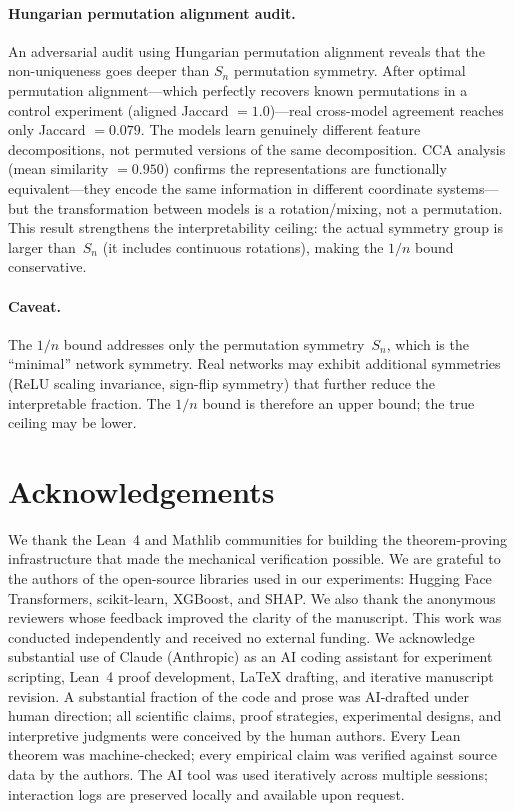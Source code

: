 \documentclass[11pt,a4paper]{article}
\begin{document}
\paragraph{Hungarian permutation alignment audit.}
An adversarial audit using Hungarian permutation alignment reveals that the
non-uniqueness goes deeper than $S_n$ permutation symmetry.  After optimal
permutation alignment---which perfectly recovers known permutations in a
control experiment (aligned Jaccard $= 1.0$)---real cross-model agreement
reaches only Jaccard $= 0.079$.  The models learn genuinely different feature
decompositions, not permuted versions of the same decomposition.  CCA
analysis (mean similarity $= 0.950$) confirms the representations are
functionally equivalent---they encode the same information in different
coordinate systems---but the transformation between models is a
rotation/mixing, not a permutation.  This result strengthens the
interpretability ceiling: the actual symmetry group is larger than~$S_n$
(it includes continuous rotations), making the $1/n$ bound conservative.

\paragraph{Caveat.}
The $1/n$ bound addresses only the permutation symmetry~$S_n$, which is the
``minimal'' network symmetry.  Real networks may exhibit additional symmetries
(ReLU scaling invariance, sign-flip symmetry) that further reduce the
interpretable fraction.  The $1/n$ bound is therefore an upper bound; the true
ceiling may be lower.

\section*{Acknowledgements}

We thank the Lean~4 and Mathlib communities for building the theorem-proving
infrastructure that made the mechanical verification possible.  We are grateful
to the authors of the open-source libraries used in our experiments: Hugging
Face Transformers, scikit-learn, XGBoost, and SHAP.  We also thank the
anonymous reviewers whose feedback improved the clarity of the manuscript.
This work was conducted independently and received no external funding.
We acknowledge substantial use of Claude (Anthropic) as an AI coding
assistant for experiment scripting, Lean~4 proof development, LaTeX
drafting, and iterative manuscript revision.  A substantial fraction of
the code and prose was AI-drafted under human direction; all scientific
claims, proof strategies, experimental designs, and interpretive
judgments were conceived by the human authors.  Every Lean theorem was
machine-checked; every empirical claim was verified against source data
by the authors.  The AI tool was used iteratively across multiple sessions;
interaction logs are preserved locally and available upon request.
\end{document}
